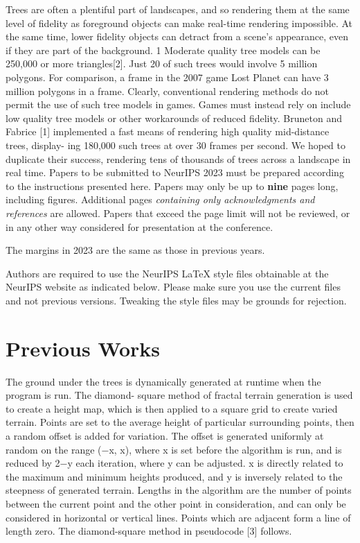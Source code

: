 \documentclass{article}
\begin{document}
Trees are often a plentiful part of landscapes, and so rendering them at the same level of fidelity as foreground objects can make real-time rendering impossible. At the same time, lower fidelity objects can detract from a scene’s appearance, even if they are part of the background.
 1
Moderate quality tree models can be 250,000 or more triangles[2]. Just 20 of such trees would involve 5 million polygons. For comparison, a frame in the 2007 game Lost Planet can have 3 million polygons in a frame. Clearly, conventional rendering methods do not permit the use of such tree models in games. Games must instead rely on include low quality tree models or other workarounds of reduced fidelity.
Bruneton and Fabrice [1] implemented a fast means of rendering high quality mid-distance trees, display- ing 180,000 such trees at over 30 frames per second. We hoped to duplicate their success, rendering tens of thousands of trees across a landscape in real time.
Papers to be submitted to NeurIPS 2023 must be prepared according to the
instructions presented here. Papers may only be up to {\bf nine} pages long,
including figures. Additional pages \emph{containing only acknowledgments and
references} are allowed. Papers that exceed the page limit will not be
reviewed, or in any other way considered for presentation at the conference.


The margins in 2023 are the same as those in previous years.


Authors are required to use the NeurIPS \LaTeX{} style files obtainable at the
NeurIPS website as indicated below. Please make sure you use the current files
and not previous versions. Tweaking the style files may be grounds for
rejection.


\section{Previous Works}
The ground under the trees is dynamically generated at runtime when the program is run. The diamond- square method of fractal terrain generation is used to create a height map, which is then applied to a square grid to create varied terrain. Points are set to the average height of particular surrounding points, then a random offset is added for variation. The offset is generated uniformly at random on the range (−x, x), where x is set before the algorithm is run, and is reduced by 2−y each iteration, where y can be adjusted. x is directly related to the maximum and minimum heights produced, and y is inversely related to the steepness of generated terrain. Lengths in the algorithm are the number of points between the current point and the other point in consideration, and can only be considered in horizontal or vertical lines. Points which are adjacent form a line of length zero. The diamond-square method in pseudocode [3] follows. 
\end{document}
